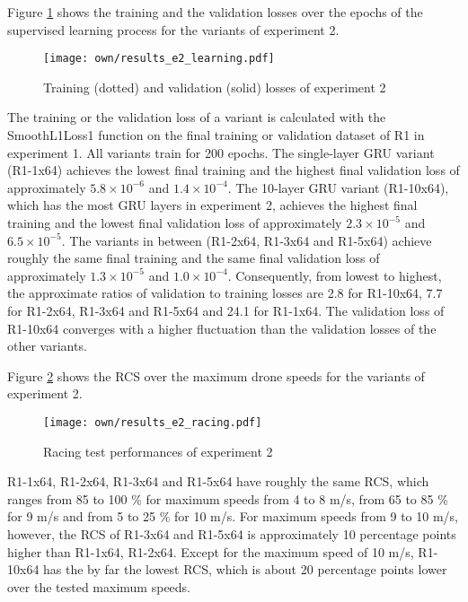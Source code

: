 Figure \ref{fig:e2_learn} shows the 
training and the validation losses
over the epochs of the supervised learning process for the variants of experiment 2.
\begin{figure}
    \centering
    \texttt{[image: own/results\_e2\_learning.pdf]}
    \caption[
        Training and validation losses of experiment 2
    ]{
        Training (dotted) and validation (solid) losses of experiment 2
    \label{fig:e2_learn}}
\end{figure}
The training or the validation loss of a variant is calculated with the SmoothL1Loss1 function 
on the final training or validation dataset of R1 in experiment 1.
All variants train for 200 epochs.
The single-layer GRU variant (R1-1x64)
achieves the lowest final training and the highest final validation loss
of approximately $5.8\times 10^{-6}$ and $1.4\times 10^{-4}$.
The 10-layer GRU variant (R1-10x64),
which has the most GRU layers in experiment 2,
achieves the highest final training and the lowest final validation loss
of approximately $2.3\times 10^{-5}$ and $6.5\times 10^{-5}$.
The variants in between (R1-2x64, R1-3x64 and R1-5x64)
achieve roughly the same final training and the same final validation loss
of approximately $1.3\times 10^{-5}$ and $1.0\times 10^{-4}$.
Consequently, from lowest to highest, the approximate
ratios of validation to training losses are 2.8 for R1-10x64, 7.7 for R1-2x64, R1-3x64 and R1-5x64
and 24.1 for R1-1x64.
The validation loss of R1-10x64
converges with a higher fluctuation than the validation losses of the other variants.


Figure \ref{fig:e2_rcs} shows the RCS over the maximum drone speeds
for the variants of experiment 2.
\begin{figure}
    \centering
    \texttt{[image: own/results\_e2\_racing.pdf]}
    \caption[
        Racing test performances of experiment 2
    ]{
        Racing test performances of experiment 2
    \label{fig:e2_rcs}}
\end{figure}
R1-1x64, R1-2x64, R1-3x64 and R1-5x64
have roughly the same RCS,
which ranges from 85 to 100 \%
for maximum speeds from 4 to 8 m/s,
from 65 to 85 \% for 9 m/s and 
from 5 to 25 \% for 10 m/s.
For maximum speeds from 9 to 10 m/s, however,
the RCS of R1-3x64 and R1-5x64 is approximately 10 percentage points higher than R1-1x64, R1-2x64.
Except for the maximum speed of 10 m/s,
R1-10x64 has the by far the lowest RCS,
which is about 20 percentage points lower over the tested maximum speeds.



